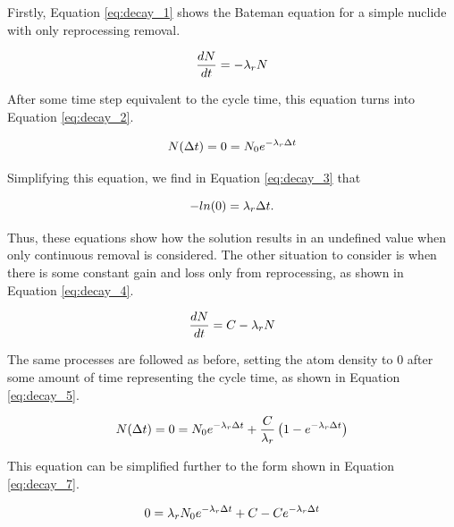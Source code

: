 Firstly, Equation \eqref{eq:decay_1} shows the Bateman equation for a simple nuclide with only reprocessing removal.

\begin{equation} \hfill
\frac{dN}{dt} = -\lambda_r N
\hfill\label{eq:decay_1} \end{equation}

After some time step equivalent to the cycle time, this equation turns into Equation \eqref{eq:decay_2}.

\begin{equation} \hfill
N(\Delta t) = 0 = N_0 e^{-\lambda_r \Delta t}
\hfill\label{eq:decay_2} \end{equation}

Simplifying this equation, we find in Equation \eqref{eq:decay_3} that

\begin{equation} \hfill
-ln(0) = \lambda_r \Delta t.
\hfill\label{eq:decay_3} \end{equation}

Thus, these equations show how the solution results in an undefined value when only continuous removal is considered. The other situation to consider is when there is some constant gain and loss only from reprocessing, as shown in Equation \eqref{eq:decay_4}.

\begin{equation} \hfill
\frac{dN}{dt} = C -\lambda_r N
\hfill\label{eq:decay_4} \end{equation}

The same processes are followed as before, setting the atom density to 0 after some amount of time representing the cycle time, as shown in Equation \eqref{eq:decay_5}.

\begin{equation} \hfill
N(\Delta t) = 0 = N_0 e^{-\lambda_r \Delta t} + \frac{C}{\lambda_r} \left( 1 - e^{-\lambda_r \Delta t} \right)
\hfill\label{eq:decay_5} \end{equation}




This equation can be simplified further to the form shown in Equation \eqref{eq:decay_7}.

\begin{equation} \hfill
0 = \lambda_r N_0 e^{-\lambda_r \Delta t} + C - C e^{-\lambda_r \Delta t}
\hfill\label{eq:decay_7} \end{equation}


